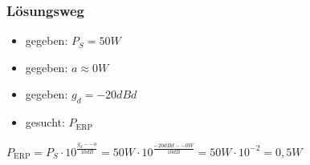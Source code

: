 \begin{frame}
\frametitle{Lösungsweg}
\begin{itemize}
  \item gegeben: $P_S = 50W$
  \item gegeben: $a \approx 0W$
  \item gegeben: $g_d = -20dBd$
  \item gesucht: $P_{\textrm{ERP}}$
  \end{itemize}
    \pause
    $P_{\textrm{ERP}} = P_S \cdot 10^{\frac{g_d -- a}{10dB}} = 50W \cdot 10^{\frac{-20dBd -- 0W}{10dB}} = 50W \cdot 10^{-2} = 0,5W$



\end{frame}%
